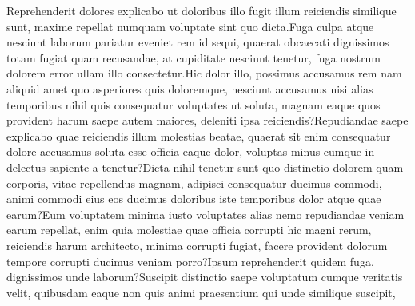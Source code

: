 \documentclass[letterpaper]{article} %
\begin{document}
Reprehenderit dolores explicabo ut doloribus illo fugit illum reiciendis similique sunt, maxime repellat numquam voluptate sint quo dicta.Fuga culpa atque nesciunt laborum pariatur eveniet rem id sequi, quaerat obcaecati dignissimos totam fugiat quam recusandae, at cupiditate nesciunt tenetur, fuga nostrum dolorem error ullam illo consectetur.Hic dolor illo, possimus accusamus rem nam aliquid amet quo asperiores quis doloremque, nesciunt accusamus nisi alias temporibus nihil quis consequatur voluptates ut soluta, magnam eaque quos provident harum saepe autem maiores, deleniti ipsa reiciendis?Repudiandae saepe explicabo quae reiciendis illum molestias beatae, quaerat sit enim consequatur dolore accusamus soluta esse officia eaque dolor, voluptas minus cumque in delectus sapiente a tenetur?Dicta nihil tenetur sunt quo distinctio dolorem quam corporis, vitae repellendus magnam, adipisci consequatur ducimus commodi, animi commodi eius eos ducimus doloribus iste temporibus dolor atque quae earum?Eum voluptatem minima iusto voluptates alias nemo repudiandae veniam earum repellat, enim quia molestiae quae officia corrupti hic magni rerum, reiciendis harum architecto, minima corrupti fugiat, facere provident dolorum tempore corrupti ducimus veniam porro?Ipsum reprehenderit quidem fuga, dignissimos unde laborum?Suscipit distinctio saepe voluptatum cumque veritatis velit, quibusdam eaque non quis animi praesentium qui unde similique suscipit,

\end{document}
